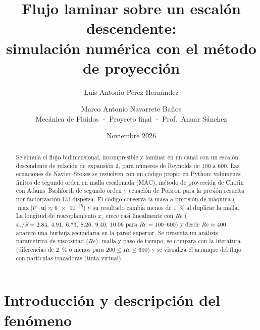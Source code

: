\documentclass[11pt,letterpaper]{article}
\title{\textbf{Flujo laminar sobre un escalón descendente:}\\[2pt]
  simulación numérica con el método de proyección}
\author{Luis Antonio Pérez Hernández \and Marco Antonio Navarrete Baños\\[6pt]
  \small Mecánica de Fluidos · Proyecto final · Prof.\ Anuar Sánchez}
\date{Noviembre 2026}
\newcommand{\vu}{\mathbf{u}}
\newcommand{\Rey}{\mathit{Re}}
\begin{document}
\maketitle

\begin{center}
\end{center}

\begin{abstract}
Se simula el flujo bidimensional, incompresible y laminar en un canal con un escalón descendente de relación de
expansión 2, para números de Reynolds de 100 a 600. Las ecuaciones de Navier–Stokes se resuelven con un código propio
en Python: volúmenes finitos de segundo orden en malla escalonada (MAC), método de proyección de Chorin con
Adams–Bashforth de segundo orden y ecuación de Poisson para la presión resuelta por factorización LU dispersa. El código
conserva la masa a precisión de máquina ($\max|\nabla\cdot\vu|\approx\num{6e-15}$) y su resultado cambia menos de
\SI{1}{\percent} al duplicar la malla. La longitud de reacoplamiento $x_r$ crece casi linealmente con $\Rey$
($x_r/S = 2.84,\ 4.91,\ 6.73,\ 8.26,\ 9.40,\ 10.06$ para $\Rey = 100$–600) y desde $\Rey\approx400$ aparece una burbuja
secundaria en la pared superior. Se presenta un análisis paramétrico de viscosidad ($\Rey$), malla y paso de tiempo, se
compara con la literatura (diferencias de \SI{2}{\percent} o menos para $200\le\Rey\le600$) y se visualiza el arranque del
flujo con partículas trazadoras (tinta virtual).
\end{abstract}

\tableofcontents
\newpage

\section{Introducción y descripción del fenómeno}
\end{document}
